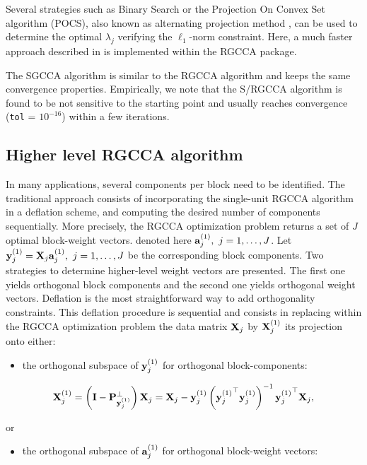 \documentclass[
]{jss}
\providecommand{\tightlist}{%
  \setlength{\itemsep}{0pt}\setlength{\parskip}{0pt}}
\begin{document}
Several strategies such as Binary Search or the Projection On Convex Set
algorithm (POCS), also known as alternating projection method
\citep{Boyd2003}, can be used to determine the optimal \(\lambda_j\)
verifying the \(\ell_1\)-norm constraint. Here, a much faster approach
described in \citep{Gloaguen2017} is implemented within the RGCCA
package.

The SGCCA algorithm is similar to the RGCCA algorithm and keeps the same
convergence properties. Empirically, we note that the S/RGCCA algorithm
is found to be not sensitive to the starting point and usually reaches
convergence (\texttt{tol} = \(10^{-16}\)) within a few iterations.

\hypertarget{higher-level-rgcca-algorithm}{%
\subsection{Higher level RGCCA
algorithm}\label{higher-level-rgcca-algorithm}}

In many applications, several components per block need to be
identified. The traditional approach consists of incorporating the
single-unit RGCCA algorithm in a deflation scheme, and computing the
desired number of components sequentially. More precisely, the RGCCA
optimization problem returns a set of \(J\) optimal block-weight
vectors. denoted here \(\mathbf{a}_j^{(1)}, ~ j = 1, \ldots, J\). Let
\(\mathbf{y}_j^{(1)} = \mathbf{X}_j\mathbf{a}_j^{(1)}, ~ j = 1, \ldots, J\) be the
corresponding block components. Two strategies to determine higher-level
weight vectors are presented. The first one yields orthogonal block
components and the second one yields orthogonal weight vectors.
Deflation is the most straightforward way to add orthogonality
constraints. This deflation procedure is sequential and consists in
replacing within the RGCCA optimization problem the data matrix \(\mathbf{X}_j\)
by \(\mathbf{X}_j^{(1)}\) its projection onto either:

\begin{itemize}
\tightlist
\item
  the orthogonal subspace of \(\mathbf{y}_j^{(1)}\) for orthogonal
  block-components:
\end{itemize}

\[\mathbf{X}_j^{(1)} = \left(\mathbf{I} - \mathbf{P}^\perp_{\mathbf{y}_j^{(1)}} \right) \mathbf{X}_j = 
\mathbf{X}_j - \mathbf{y}_j^{(1)} \left( {\mathbf{y}_j^{(1)}}^\top \mathbf{y}_j^{(1)} \right)^{-1}{\mathbf{y}_j^{(1)}}^\top \mathbf{X}_j,\]

or

\begin{itemize}
\tightlist
\item
  the orthogonal subspace of \(\mathbf{a}_j^{(1)}\) for orthogonal
  block-weight vectors:
\end{itemize}
\end{document}
